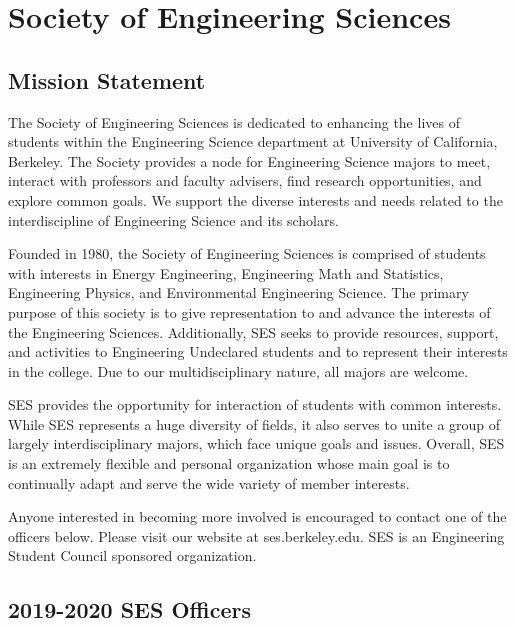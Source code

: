 \chapter*{Society of Engineering Sciences}

\textit{}

\section*{Mission Statement}

The Society of Engineering Sciences is dedicated to enhancing the lives of students within the Engineering Science department at University of California, Berkeley. The Society provides a node for Engineering Science majors to meet, interact with professors and faculty advisers, find research opportunities, and explore common goals. We support the diverse interests and needs related to the interdiscipline of Engineering Science and its scholars.

Founded in 1980, the Society of Engineering Sciences is comprised of students with interests in Energy Engineering, Engineering Math and Statistics, Engineering Physics, and Environmental Engineering Science. The primary purpose of this society is to give representation to and advance the interests of the Engineering Sciences. Additionally, SES seeks to provide resources, support, and activities to Engineering Undeclared students and to represent their interests in the college. Due to our multidisciplinary nature, all majors are welcome.

SES provides the opportunity for interaction of students with common interests. While SES represents a huge diversity of fields, it also serves to unite a group of largely interdisciplinary majors, which face unique goals and issues. Overall, SES is an extremely flexible and personal organization whose main goal is to continually adapt and serve the wide variety of member interests.

Anyone interested in becoming more involved is encouraged to contact one of the officers below. Please visit our website at ses.berkeley.edu. SES is an Engineering Student Council sponsored organization.

\section*{2019-2020 SES Officers}

